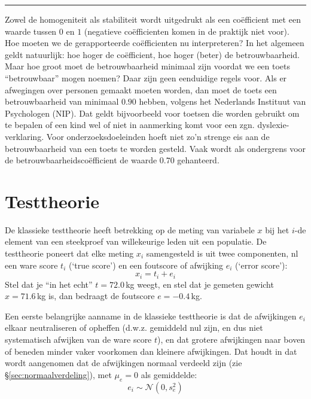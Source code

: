 \documentclass[
]{book}
\begin{document}
\begin{center}\rule{0.5\linewidth}{0.5pt}\end{center}

Zowel de homogeniteit als stabiliteit wordt uitgedrukt als een
coëfficient met een waarde tussen \(0\) en \(1\) (negatieve coëfficienten
komen in de praktijk niet voor). Hoe moeten we de gerapporteerde
coëfficienten nu interpreteren? In het algemeen geldt natuurlijk: hoe
hoger de coëfficient, hoe hoger (beter) de betrouwbaarheid. Maar hoe
groot moet de betrouwbaarheid minimaal zijn voordat we een toets
``betrouwbaar'' mogen noemen? Daar zijn geen eenduidige regels voor. Als
er afwegingen over personen gemaakt moeten worden, dan moet de toets een
betrouwbaarheid van minimaal \(0.90\) hebben, volgens het Nederlands
Instituut van Psychologen (NIP). Dat geldt bijvoorbeeld voor toetsen die
worden gebruikt om te bepalen of een kind wel of niet in aanmerking komt
voor een zgn. dyslexie-verklaring. Voor onderzoeksdoeleinden hoeft niet
zo'n strenge eis aan de betrouwbaarheid van een toets te worden gesteld.
Vaak wordt als ondergrens voor de betrouwbaarheidscoëfficient de waarde
\(0.70\) gehanteerd.

\hypertarget{testtheorie}{%
\section{Testtheorie}\label{testtheorie}}

De klassieke testtheorie heeft betrekking op de meting van variabele \(x\)
bij het \(i\)-de element van een steekproef van willekeurige leden uit een
populatie. De testtheorie poneert dat elke meting \(x_i\) samengesteld is
uit twee componenten, nl een ware score \(t_i\) (`true score') en een
foutscore of afwijking \(e_i\) (`error score'):
\begin{equation}
  x_i = t_i + e_i
  \label{eq:obs-true-error}
\end{equation}
Stel dat je ``in het echt'' \(t=72.0\) kg weegt, en stel
dat je gemeten gewicht \(x=71.6\) kg is, dan bedraagt de foutscore
\(e=-0.4\) kg.

Een eerste belangrijke aanname in de klassieke testtheorie is dat de
afwijkingen \(e_i\) elkaar neutraliseren of opheffen (d.w.z. gemiddeld nul
zijn, en dus niet systematisch afwijken van de ware score \(t\)), en dat
grotere afwijkingen naar boven of beneden minder vaker voorkomen dan
kleinere afwijkingen. Dat houdt in dat wordt aangenomen dat de
afwijkingen normaal verdeeld zijn (zie
§\ref{sec:normaalverdeling}), met \(\mu_e=0\) als gemiddelde:
\begin{equation}
  \label{eq:normal-error}
  e_i \sim \mathcal{N}(0,s^2_e)
\end{equation}
\end{document}
